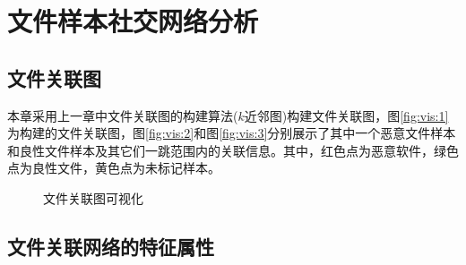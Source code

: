 \section{文件样本社交网络分析}
\subsection{文件关联图}
本章采用上一章中文件关联图的构建算法($k$近邻图)构建文件关联图，图\ref{fig:vis:1}为构建的文件关联图，图\ref{fig:vis:2}和图\ref{fig:vis:3}分别展示了其中一个恶意文件样本和良性文件样本及其它们一跳范围内的关联信息。其中，红色点为恶意软件，绿色点为良性文件，黄色点为未标记样本。
\begin{figure}[!ht]
\centering
{}
{}
{}
\caption{文件关联图可视化}
\label{fig:vis}
\end{figure}
\subsection{文件关联网络的特征属性}
